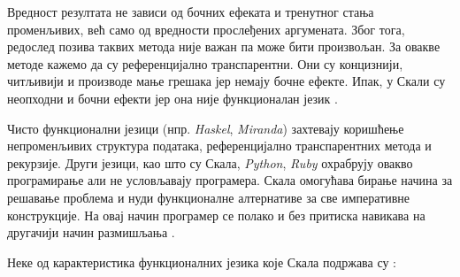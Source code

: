 \documentclass[12pt,oneside]{memoir}
\begin{document}
Вредност резултата не зависи од бочних ефеката и тренутног стања променљивих, већ само од вредности прослеђених аргумената. Због тога, редослед позива таквих метода није важан па може бити произвољан. За овакве методе кажемо да су референцијално транспарентни. Они су концизнији, читљивији и производе мање грешака јер немају бочне ефекте. Ипак, у Скали су неопходни и бочни ефекти јер она није функционалан језик \cite{funkMilena}.
\par Чисто функционални језици (нпр. \textit{Haskel}, \textit{Miranda}) захтевају коришћење непроменљивих структура података, референцијално транспарентних метода и рекурзије. Други језици, као што су Скала, \textit{Python}, \textit{Ruby} охрабрују овакво програмирање али не условљавају програмера. Скала омогућава бирање начина за решавање проблема и нуди функционалне алтернативе за све императивне конструкције. На овај начин програмер се полако и без притиска навикава на другачији начин размишљања \cite{funkMilena, progInScala}.
\par Неке од карактеристика функционалних језика које Скала подржава су \cite{progInScala}:
\end{document}
